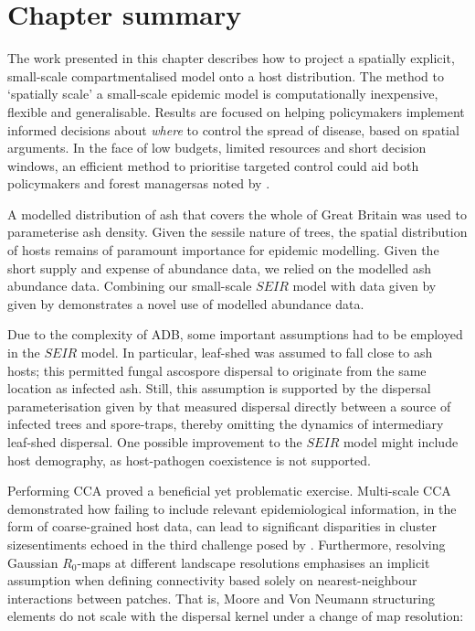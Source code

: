 \section{Chapter summary}

The work presented in this chapter describes how to project a spatially explicit, small-scale compartmentalised model onto a host distribution.
The method to `spatially scale' a small-scale epidemic model is computationally inexpensive, flexible and generalisable.
Results are focused on helping policymakers implement informed decisions about \textit{where} to control the spread of disease, based on spatial arguments.
In the face of low budgets, limited resources and short decision windows, an efficient method to prioritise targeted control could aid both policymakers and forest managers\textemdash as noted by \cite{13-challenges, time-varying-infectivity}.

A modelled distribution of ash that covers the whole of Great Britain was used to parameterise ash density.
Given the sessile nature of trees, the spatial distribution of hosts remains of paramount importance for epidemic modelling.
Given the short supply and expense of abundance data, we relied on the modelled ash abundance data.
Combining our small-scale $SEIR$ model with data given by given by \cite{hill.data} demonstrates a novel use of modelled abundance data.

Due to the complexity of ADB, some important assumptions had to be employed in the $SEIR$ model.
In particular, leaf-shed was assumed to fall close to ash hosts; 
this permitted fungal ascospore dispersal to originate from the same location as infected ash.
Still, this assumption is supported by the dispersal parameterisation given by \cite{grosdidier2018tracking} that measured dispersal directly between a source of infected trees and spore-traps, thereby omitting the dynamics of intermediary leaf-shed dispersal.
One possible improvement to the $SEIR$ model might include host demography, as host-pathogen coexistence is not supported.

Performing CCA proved a beneficial yet problematic exercise.
Multi-scale CCA demonstrated how failing to include relevant epidemiological information, in the form of coarse-grained host data, can lead to significant disparities in cluster size\textemdash sentiments echoed in the third challenge posed by \cite{13-challenges}.
Furthermore, resolving Gaussian $R_0$-maps at different landscape resolutions emphasises an implicit assumption when defining connectivity based solely on nearest-neighbour interactions between patches. 
That is, Moore and Von Neumann structuring elements do not scale with the dispersal kernel under a change of map resolution:

